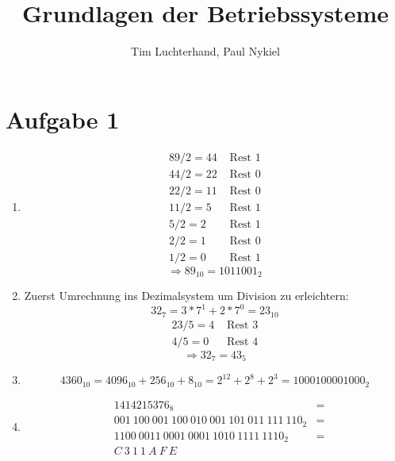 \documentclass{scrreprt}
\title{Grundlagen der Betriebssysteme}
\author{Tim Luchterhand, Paul Nykiel}
\begin{document}
    \maketitle
    \section{Aufgabe 1}
    \begin{enumerate}[label = (\alph*)]
        \item 
            \begin{align*}
                89 / 2  =  44 & \text{ Rest } 1 \\
                44 / 2  =  22 & \text{ Rest } 0 \\
                22 / 2  =  11 & \text{ Rest } 0 \\
                11 / 2  =  5  & \text{ Rest } 1 \\
                5 / 2  =  2 & \text{ Rest } 1 \\
                2 /2  =  1 & \text{ Rest } 0 \\
                1 / 2  =  0 & \text{ Rest } 1 
            \end{align*}
            \begin{equation*}
                \Rightarrow {89}_{10} = {1011001}_2
            \end{equation*}
        \item
            Zuerst Umrechnung ins Dezimalsystem um Division zu erleichtern:
            \begin{equation*}
                {32}_7 =  3 * 7^1 + 2  * 7^0  = {23}_{10} 
            \end{equation*}
            \begin{align*}
                23 / 5 =  4 & \text{ Rest } 3\\
                4 / 5 =  0 & \text{ Rest } 4
            \end{align*}
            \begin{equation*}
                \Rightarrow  {32}_7 = {43}_5
            \end{equation*}
        \item
            \begin{equation*}
                {4360}_{10} = {4096}_{10} + {256}_{10} + 8_{10} = 2^{12} + 2^{8} + 2^{3} = {1000100001000}_2
            \end{equation*}
        \item
            \begin{eqnarray*}
                & {1414215376}_8 & = \\
                & {001\ 100\ 001\ 100\ 010\ 001\ 101\ 011\ 111\ 110}_2 & = \\
                & {1100\ 0011\ 0001\ 0001\ 1010\ 1111\ 1110}_2 & = \\
                & {C\ 3\ 1\ 1\ A\ F\ E} &
            \end{eqnarray*}
    \end{enumerate}
\end{document}
